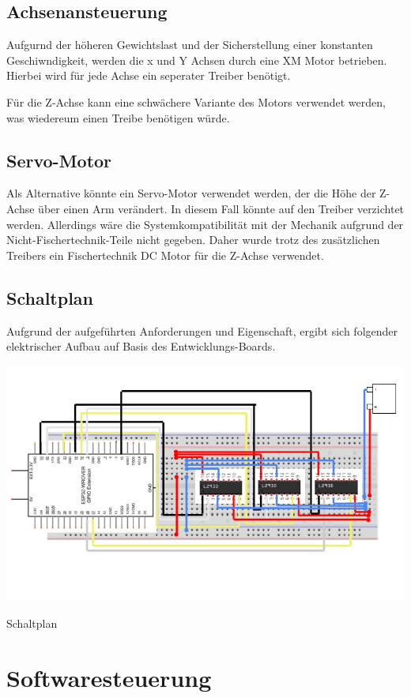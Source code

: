 \documentclass[conference,compsoc,final,a4paper]{IEEEtran}
\begin{document}
\subsection{Achsenansteuerung}

Aufgurnd der höheren Gewichtslast und der Sicherstellung einer konstanten Geschiwndigkeit, werden die x und Y Achsen durch eine XM Motor betrieben.
Hierbei wird für jede Achse ein seperater Treiber benötigt.

Für die Z-Achse kann eine schwächere Variante des Motors verwendet werden, was wiedereum einen Treibe benötigen würde.

\subsection{Servo-Motor}

Als Alternative könnte ein Servo-Motor verwendet werden, der die Höhe der Z-Achse über einen Arm verändert. 
In diesem Fall könnte auf den Treiber verzichtet werden. Allerdings wäre die Systemkompatibilität mit der Mechanik aufgrund der Nicht-Fischertechnik-Teile nicht gegeben. 
Daher wurde trotz des zusätzlichen Treibers ein Fischertechnik DC Motor für die Z-Achse verwendet.


\subsection{Schaltplan}

Aufgrund der aufgeführten Anforderungen und Eigenschaft, ergibt sich folgender elektrischer Aufbau auf Basis des Entwicklungs-Boards.

\includegraphics{../images/schaltplan.png}
\caption{Schaltplan}
\label{Elektrik:Schaltplan}


\section{Softwaresteuerung}
\end{document}
